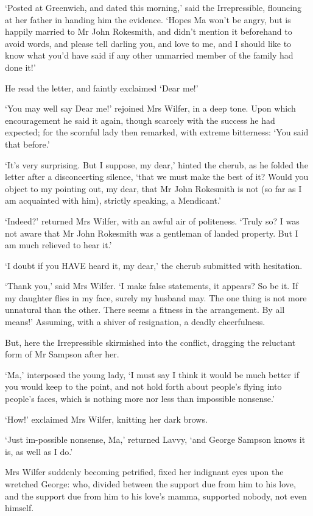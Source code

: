 ‘Posted at Greenwich, and dated this morning,’ said the Irrepressible,
flouncing at her father in handing him the evidence. ‘Hopes Ma won’t be
angry, but is happily married to Mr John Rokesmith, and didn’t mention
it beforehand to avoid words, and please tell darling you, and love
to me, and I should like to know what you’d have said if any other
unmarried member of the family had done it!’

He read the letter, and faintly exclaimed ‘Dear me!’

‘You may well say Dear me!’ rejoined Mrs Wilfer, in a deep tone. Upon
which encouragement he said it again, though scarcely with the success
he had expected; for the scornful lady then remarked, with extreme
bitterness: ‘You said that before.’

‘It’s very surprising. But I suppose, my dear,’ hinted the cherub, as he
folded the letter after a disconcerting silence, ‘that we must make the
best of it? Would you object to my pointing out, my dear, that Mr
John Rokesmith is not (so far as I am acquainted with him), strictly
speaking, a Mendicant.’

‘Indeed?’ returned Mrs Wilfer, with an awful air of politeness. ‘Truly
so? I was not aware that Mr John Rokesmith was a gentleman of landed
property. But I am much relieved to hear it.’

‘I doubt if you HAVE heard it, my dear,’ the cherub submitted with
hesitation.

‘Thank you,’ said Mrs Wilfer. ‘I make false statements, it appears? So
be it. If my daughter flies in my face, surely my husband may. The one
thing is not more unnatural than the other. There seems a fitness in the
arrangement. By all means!’ Assuming, with a shiver of resignation, a
deadly cheerfulness.

But, here the Irrepressible skirmished into the conflict, dragging the
reluctant form of Mr Sampson after her.

‘Ma,’ interposed the young lady, ‘I must say I think it would be much
better if you would keep to the point, and not hold forth about
people’s flying into people’s faces, which is nothing more nor less than
impossible nonsense.’

‘How!’ exclaimed Mrs Wilfer, knitting her dark brows.

‘Just im-possible nonsense, Ma,’ returned Lavvy, ‘and George Sampson
knows it is, as well as I do.’

Mrs Wilfer suddenly becoming petrified, fixed her indignant eyes upon
the wretched George: who, divided between the support due from him to
his love, and the support due from him to his love’s mamma, supported
nobody, not even himself.


